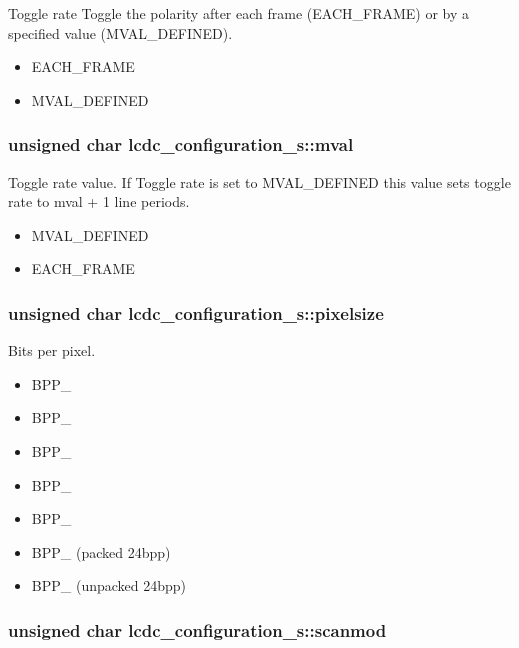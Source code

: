 Toggle rate Toggle the polarity after each frame (EACH\_\-FRAME) or by a specified value (MVAL\_\-DEFINED). 

\begin{itemize}
\item EACH\_\-FRAME \item MVAL\_\-DEFINED \end{itemize}
\hypertarget{structlcdc__configuration__s_740b398c5684557414208ae5197b01d4}{
\subsubsection[{mval}]{\setlength{\rightskip}{0pt plus 5cm}unsigned char {\bf lcdc\_\-configuration\_\-s::mval}}}
\label{structlcdc__configuration__s_740b398c5684557414208ae5197b01d4}


Toggle rate value. If Toggle rate is set to MVAL\_\-DEFINED this value sets toggle rate to mval + 1 line periods. 

\begin{itemize}
\item MVAL\_\-DEFINED \item EACH\_\-FRAME \end{itemize}
\hypertarget{structlcdc__configuration__s_3725097d44bfecb6396b9143ac302f24}{
\subsubsection[{pixelsize}]{\setlength{\rightskip}{0pt plus 5cm}unsigned char {\bf lcdc\_\-configuration\_\-s::pixelsize}}}
\label{structlcdc__configuration__s_3725097d44bfecb6396b9143ac302f24}


Bits per pixel. 

\begin{itemize}
\item BPP\_ \item BPP\_ \item BPP\_ \item BPP\_ \item BPP\_ \item BPP\_ (packed 24bpp) \item BPP\_ (unpacked 24bpp) \end{itemize}
\hypertarget{structlcdc__configuration__s_e208162dfd1fd4be065ae86243fbf1f0}{
\subsubsection[{scanmod}]{\setlength{\rightskip}{0pt plus 5cm}unsigned char {\bf lcdc\_\-configuration\_\-s::scanmod}}}
\label{structlcdc__configuration__s_e208162dfd1fd4be065ae86243fbf1f0}


